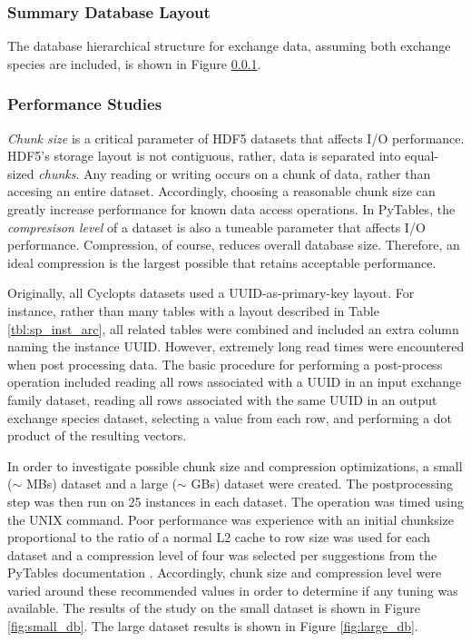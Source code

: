 
\subsubsection{Summary Database Layout}

The database hierarchical structure for exchange data, assuming both exchange
species are included, is shown in Figure \ref{}.

\subsubsection{Performance Studies}\label{method:tools:hdf5:study}

\textit{Chunk size} is a critical parameter of HDF5 datasets that affects I/O
performance. HDF5's storage layout is not contiguous, rather, data is separated
into equal-sized \textit{chunks}. Any reading or writing occurs on a chunk of
data, rather than accesing an entire dataset. Accordingly, choosing a reasonable
chunk size can greatly increase performance for known data access operations. In
PyTables, the \textit{compresison level} of a dataset is also a tuneable
parameter that affects I/O performance. Compression, of course, reduces overall
database size. Therefore, an ideal compression is the largest possible that
retains acceptable performance.

Originally, all Cyclopts datasets used a UUID-as-primary-key layout. For
instance, rather than many tables with a layout described in Table
\ref{tbl:sp_inst_arc}, all related tables were combined and included an extra
column naming the instance UUID. However, extremely long read times were
encountered when post processing data. The basic procedure for performing a
post-process operation included reading all rows associated with a UUID in an
input exchange family dataset, reading all rows associated with the same UUID in
an output exchange species dataset, selecting a value from each row, and
performing a dot product of the resulting vectors. 

In order to investigate possible chunk size and compression optimizations, a
small ($\sim$ MBs) dataset and a large ($\sim$ GBs) dataset were created. The
postprocessing step was then run on 25 instances in each dataset. The operation
was timed using the UNIX  command. Poor performance was experience
with an initial chunksize proportional to the ratio of a normal L2 cache to row
size was used for each dataset and a compression level of four was selected per
suggestions from the PyTables documentation \cite{tablesopt}. Accordingly, chunk
size and compression level were varied around these recommended values in order
to determine if any tuning was available. The results of the study on the small
dataset is shown in Figure \ref{fig:small_db}. The large dataset results is
shown in Figure \ref{fig:large_db}.

